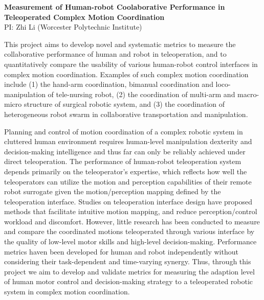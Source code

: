 \pagebreak

\begin{center}
	{\Large \bf Measurement of Human-robot Coolaborative Performance in Teleoperated Complex Motion Coordination}\\
    \vspace{4pt}
   	{\large PI: Zhi Li (Worcester Polytechnic Institute)}
\end{center}

\vspace{1 em}

This project aims to develop novel and systematic metrics to measure the collaborative performance of human and robot in teleoperation, and to quantitatively compare the usability of various human-robot control interfaces in complex motion coordination. Examples of such complex motion coordination include (1) the hand-arm coordination, bimanual coordination and loco-manipulation of tele-nursing robot, (2) the coordination of multi-arm and macro-micro structure of surgical robotic system, and (3) the coordination of heterogeneous robot swarm in collaborative transportation and manipulation. 

Planning and control of motion coordination of a complex robotic system in cluttered human environment requires human-level manipulation dexterity and decision-making intelligence and thus far can only be reliably achieved under direct teleoperation. The performance of human-robot teleoperation system depends primarily on the teleoperator's expertise, which reflects how well the teleoperators can utilize the motion and perception capabilities of their remote robot surrogate given the motion/perception mapping defined by the teleoperation interface. Studies on teleoperation interface design have proposed methods that facilitate intuitive motion mapping, and reduce perception/control workload and discomfort. However, little research has been conducted to measure and compare the coordinated motions teleoperated through various interface by the quality of low-level motor skills and high-level decision-making. Performance metrics haven been developed for human and robot independently without considering their task-dependent and time-varying synergy. Thus, through this project we aim to develop and validate metrics for measuring the adaption level of human motor control and decision-making strategy to a teleoperated robotic system in complex motion coordination.  

